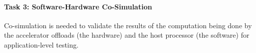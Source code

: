 
\paragraph*{Task 3: Software-Hardware Co-Simulation} 
Co-simulation is needed to validate the results of the computation being done by the accelerator offloads (the hardware) and the host processor (the software) for application-level testing. 

